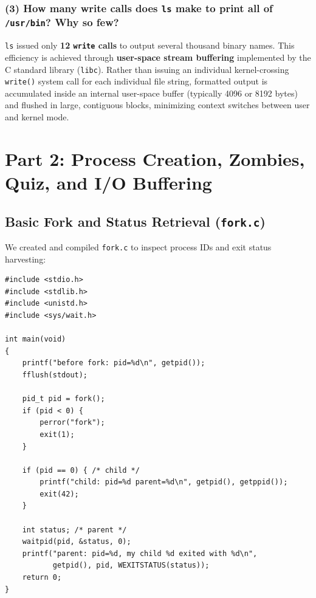 \documentclass[12pt,a4paper]{article}
\begin{document}
\subsubsection*{(3) How many write calls does \texttt{ls} make to print all of \texttt{/usr/bin}? Why so few?}
\texttt{ls} issued only \textbf{12 \texttt{write} calls} to output several thousand binary names. This efficiency is achieved through \textbf{user-space stream buffering} implemented by the C standard library (\texttt{libc}). Rather than issuing an individual kernel-crossing \texttt{write()} system call for each individual file string, formatted output is accumulated inside an internal user-space buffer (typically 4096 or 8192 bytes) and flushed in large, contiguous blocks, minimizing context switches between user and kernel mode.

\newpage

\section{Part 2: Process Creation, Zombies, Quiz, and I/O Buffering}

\subsection{Basic Fork and Status Retrieval (\texttt{fork.c})}
We created and compiled \texttt{fork.c} to inspect process IDs and exit status harvesting:

\begin{lstlisting}[style=cstyle]
#include <stdio.h>
#include <stdlib.h>
#include <unistd.h>
#include <sys/wait.h>

int main(void)
{
    printf("before fork: pid=%d\n", getpid());
    fflush(stdout);

    pid_t pid = fork();
    if (pid < 0) { 
        perror("fork"); 
        exit(1); 
    }

    if (pid == 0) { /* child */
        printf("child: pid=%d parent=%d\n", getpid(), getppid());
        exit(42);
    }

    int status; /* parent */
    waitpid(pid, &status, 0);
    printf("parent: pid=%d, my child %d exited with %d\n",
           getpid(), pid, WEXITSTATUS(status));
    return 0;
}
\end{lstlisting}
\end{document}
